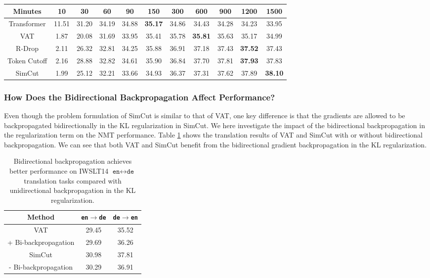 \documentclass[11pt]{article}
\begin{document}
\begin{table*}
\centering
\begin{tabular}{c|c|c|c|c|c|c|c|c|c|c}
\hline
Minutes & 10 & 30 & 60 & 90 & 150 & 300 & 600 & 900 & 1200 & 1500 \\
\hline\hline
Transformer & 11.51 & 31.20 & 34.19 & 34.88 & \bf 35.17 & 34.86 & 34.43 & 34.28 & 34.23 & 33.95 \\
VAT & 1.87 & 20.08 & 31.69 & 33.95 & 35.41 & 35.78 & \bf 35.81 & 35.63 & 35.17 & 34.99 \\
R-Drop & 2.11 & 26.32 & 32.81 & 34.25 & 35.88 & 36.91 & 37.18 & 37.43 & \bf 37.52 & 37.43 \\
Token Cutoff & 2.16 & 28.88 & 32.82 & 34.61 & 35.90 & 36.84 & 37.70 & 37.81 & \bf 37.93 & 37.83 \\
\hline
SimCut & 1.99 & 25.12 & 32.21 & 33.66 & 34.93 & 36.37 & 37.31 & 37.62 & 37.89 & \bf 38.10 \\
\end{tabular}
\caption{On the IWSLT14 \texttt{de}$\rightarrow$\texttt{en} validation set, the BLEU score increases over time in model training using SimCut. In contrast, the BLEU scores of the other strong baselines all stop increasing before $1500$ minutes. The results suggest that the use of SimCut can effectively alleviate the model training from overfitting. \label{training_time}}
\end{table*}

\subsubsection{How Does the Bidirectional Backpropagation Affect Performance?}

Even though the problem formulation of SimCut is similar to that of VAT, one key difference is that the gradients are allowed to be backpropagated bidirectionally in the KL regularization in SimCut. We here investigate the impact of the bidirectional backpropagation in the regularization term on the NMT performance. Table \ref{bi-back-prop} shows the translation results of VAT and SimCut with or without bidirectional backpropagation. We can see that both VAT and SimCut benefit from the bidirectional gradient backpropagation in the KL regularization.

\begin{table}
\centering
\begin{tabular}{c|c|c}
\hline
Method & \texttt{en}$\rightarrow$\texttt{de} & \texttt{de}$\rightarrow$\texttt{en} \\
\hline\hline
VAT & 29.45 & 35.52 \\
+ Bi-backpropagation & 29.69 & 36.26 \\
\hline
SimCut & 30.98 & 37.81 \\
- Bi-backpropagation & 30.29 & 36.91 \\
\end{tabular}
\caption{Bidirectional backpropagation achieves better performance on IWSLT14 $\texttt{en}\leftrightarrow\texttt{de}$ translation tasks compared with unidirectional backpropagation in the KL regularization. \label{bi-back-prop}}
\end{table}
\end{document}
